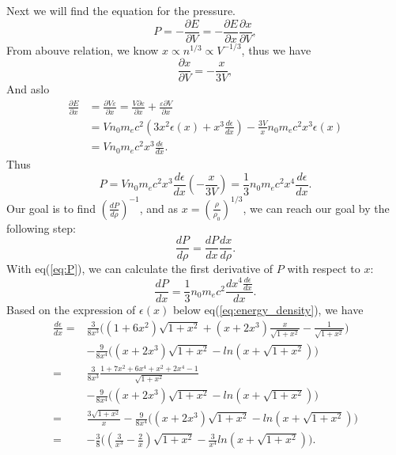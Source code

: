 \documentclass{article}
\begin{document}
Next we will find the equation for the pressure.
\begin{equation}
P=-\frac{\partial E}{\partial V} = -\frac{\partial E}{\partial x} \frac{\partial x}{\partial V},
\end{equation}
From abouve relation, we know $x\propto n^{1/3} \propto V^{-1/3}$, thus we have
\begin{equation}
\frac{\partial x}{\partial V}= - \frac{x}{3V},
\end{equation}
And aslo
\begin{equation}
\begin{aligned}
\frac{\partial E}{\partial x}& =\frac{\partial V \varepsilon}{\partial x} =\frac{V \partial \varepsilon}{\partial x}+ \frac{\varepsilon \partial V}{\partial x} \\
&=Vn_0m_e c^2 (3x^2\epsilon(x) + x^3 \frac{d \epsilon}{dx})- \frac{3V}{x}n_0m_ec^2x^3\epsilon(x) \\
&=Vn_0m_e c^2x^3 \frac{d \epsilon}{dx}.
\end{aligned}
\end{equation}
Thus
\begin{equation}
P=Vn_0m_e c^2x^3 \frac{d \epsilon}{dx} (-\frac{x}{3V}) =\frac{1}{3}n_0m_ec^2x^4\frac{d\epsilon}{dx}.
\label{eq:P}
\end{equation}
Our goal is to find $(\frac{dP}{d\rho})^{-1}$, and as $x=(\frac{\rho}{\rho_0})^{1/3}$, we can reach our goal by the following step:
\begin{equation}
\frac{dP}{d\rho} =\frac{dP}{dx}\frac{dx}{d \rho}.
\end{equation}
With eq(\ref{eq:P}), we can calculate the first derivative of $P$ with respect to $x$:
\begin{equation}
\frac{dP}{dx}=\frac{1}{3}n_0m_ec^2 \frac{dx^4 \frac{d\epsilon}{dx}}{dx}.
\end{equation}
Based on the expression of $\epsilon(x)$ below eq(\ref{eq:energy_density}), we have 
\begin{equation}
\begin{aligned}
\frac{d\epsilon}{dx}=&\frac{3}{8x^3}\big((1+6x^2)\sqrt{1+x^2} + (x+2x^3)\frac{x}{\sqrt{1+x^2}}  - \frac{1}{\sqrt{1+x^2}}\big) \\
&- \frac{9}{8x^4}\big(  (x+2x^3)\sqrt{1+x^2}  - ln(x+ \sqrt{1+x^2})   \big)  \\
=&\frac{3}{8x^3}\frac{1+7x^2 + 6x^4 +x^2 +2x^4 -1}{\sqrt{1+x^2}}  \\
& - \frac{9}{8x^4}\big(  (x+2x^3)\sqrt{1+x^2}  - ln(x+ \sqrt{1+x^2})   \big)  \\
=&\frac{3\sqrt{1+x^2}}{x} - \frac{9}{8x^4}\big(  (x+2x^3)\sqrt{1+x^2}  - ln(x+ \sqrt{1+x^2})   \big) \\
=&-\frac{3}{8}\big( (\frac{3}{x^3} -\frac{2}{x})\sqrt{1+x^2} - \frac{3}{x^4} ln(x+\sqrt{1+x^2}) \big).
\end{aligned}
\end{equation}
\end{document}
